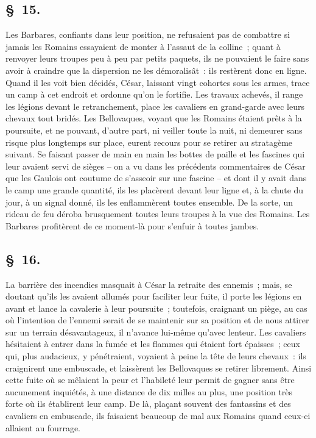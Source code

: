 \documentclass[french,twoside]{book} %
\begin{document}
\subsection[{§ 15.}]{ \textsc{§ 15.} }
\noindent Les Barbares, confiants dans leur position, ne refusaient pas de combattre si jamais les Romains essayaient de monter à l’assaut de la colline ; quant à renvoyer leurs troupes peu à peu par petits paquets, ils ne pouvaient le faire sans avoir à craindre que la dispersion ne les démoralisât : ils restèrent donc en ligne. Quand il les voit bien décidés, César, laissant vingt cohortes sous les armes, trace un camp à cet endroit et ordonne qu’on le fortifie. Les travaux achevés, il range les légions devant le retranchement, place les cavaliers en grand-garde avec leurs chevaux tout bridés. Les Bellovaques, voyant que les Romains étaient prêts à la poursuite, et ne pouvant, d’autre part, ni veiller toute la nuit, ni demeurer sans risque plus longtemps sur place, eurent recours pour se retirer au stratagème suivant. Se faisant passer de main en main les bottes de paille et les fascines qui leur avaient servi de sièges – on a vu dans les précédents commentaires de César que les Gaulois ont coutume de s’asseoir sur une fascine – et dont il y avait dans le camp une grande quantité, ils les placèrent devant leur ligne et, à la chute du jour, à un signal donné, ils les enflammèrent toutes ensemble. De la sorte, un rideau de feu déroba brusquement toutes leurs troupes à la vue des Romains. Les Barbares profitèrent de ce moment-là pour s’enfuir à toutes jambes.
\subsection[{§ 16.}]{ \textsc{§ 16.} }
\noindent La barrière des incendies masquait à César la retraite des ennemis ; mais, se doutant qu’ils les avaient allumés pour faciliter leur fuite, il porte les légions en avant et lance la cavalerie à leur poursuite ; toutefois, craignant un piège, au cas où l’intention de l’ennemi serait de se maintenir sur sa position et de nous attirer sur un terrain désavantageux, il n’avance lui-même qu’avec lenteur. Les cavaliers hésitaient à entrer dans la fumée et les flammes qui étaient fort épaisses ; ceux qui, plus audacieux, y pénétraient, voyaient à peine la tête de leurs chevaux : ils craignirent une embuscade, et laissèrent les Bellovaques se retirer librement. Ainsi cette fuite où se mêlaient la peur et l’habileté leur permit de gagner sans être aucunement inquiétés, à une distance de dix milles au plus, une position très forte où ils établirent leur camp. De là, plaçant souvent des fantassins et des cavaliers en embuscade, ils faisaient beaucoup de mal aux Romains quand ceux-ci allaient au fourrage.
\end{document}
